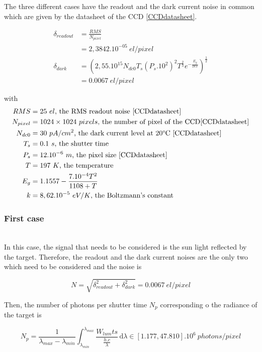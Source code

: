 The three different cases have the readout and the dark current noise in common which are given by the datasheet of the CCD \ref{CCDdatasheet}.

\begin{align}
\delta_{readout} & = \frac{RMS}{N_{pixel}} \\
& = 2,3842.10^{-05} \ el/pixel \label{eq:readout} \\
\delta_{dark} & = \left(2,55.10^{15}N_{dc0}T_s(P_s.10^2)^2T^{\frac{2}{3}}e^{-\frac{E_g}{2kT}}\right)^{\frac{1}{2}} \\
& = 0.0067 \ el/pixel \label{eq:darkcurrent}
\end{align}

with
\begin{align*}
RMS & = 25\ el\mbox{, the RMS readout noise \ref{CCDdatasheet}}\\
N_{pixel} & = 1024\times 1024 \ pixels\mbox{, the number of pixel of the CCD\ref{CCDdatasheet}}\\
N_{dc0} & = 30\ pA/cm^2\mbox{, the dark current level at 20\textdegree C \ref{CCDdatasheet}}\\
T_s & = 0.1\ s\mbox{, the shutter time}\\
P_s & = 12.10^{-6}\ m\mbox{, the  pixel size \ref{CCDdatasheet}}\\
T & = 197\ K\mbox{, the temperature}\\
E_g & = 1.1557-\frac{7.10^{-4}T^2}{1108+T}\\
k & = 8,62.10^{-5}\ eV/K\mbox{, the Boltzmann's constant}
\end{align*}


\subsubsection{First case}
\label{first case}
~\\
In this case, the signal that needs to be considered is the sun light reflected by the target. Therefore, the readout and the dark current noises are the only two which need to be considered and the noise is

\begin{equation}
\label{eq:Noise case1}
N = \sqrt{\delta_{readout}^2+\delta_{dark}^2} = 0.0067\ el/pixel
\end{equation}

Then, the number of photons per shutter time $N_p$ corresponding o the radiance of the target is

\begin{equation}
\label{eq:Number Photons per Shutter Time case1}
N_p = \frac{1}{\lambda_{max}-\lambda_{min}}\int_{\lambda_{min}}^{\lambda_{max}} \frac{W_{lum}ts}{\frac{h.c}{\lambda}} \, \mathrm d\lambda \in [1.177, 47.810].10^{6} \ photons/pixel
\end{equation}

